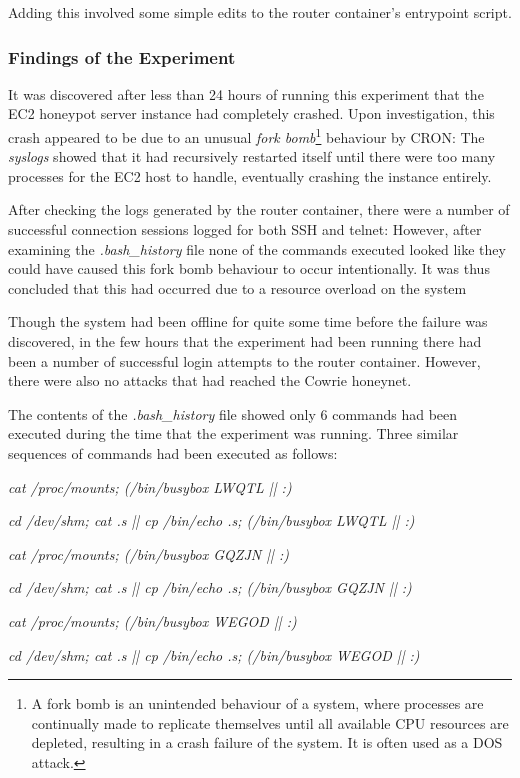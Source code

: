 Adding this involved some simple edits to the router container's entrypoint script.

\subsubsection{Findings of the Experiment}
\label{Experiment1Iteration2Results} It was discovered after less than 24 hours of running this experiment that the EC2 honeypot server instance had completely crashed. Upon investigation, this crash appeared to be due to an unusual \textit{fork bomb}\footnote{A fork bomb is an unintended behaviour of a system, where processes are continually made to replicate themselves until all available CPU resources are depleted, resulting in a crash failure of the system. It is often used as a DOS attack.} behaviour by CRON: The \textit{syslogs} showed that it had recursively restarted itself until there were too many processes for the EC2 host to handle, eventually crashing the instance entirely.

After checking the logs generated by the router container, there were a number of successful connection sessions logged for both SSH and telnet: However, after examining the \textit{.bash\_history} file none of the commands executed looked like they could have caused this fork bomb behaviour to occur intentionally. It was thus concluded that this had occurred due to a resource overload on the system

Though the system had been offline for quite some time before the failure was discovered, in the few hours that the experiment had been running there had been a number of successful login attempts to the router container. However, there were also no attacks that had reached the Cowrie honeynet. 

The contents of the \textit{.bash\_history} file showed only 6 commands had been executed during the time that the experiment was running. Three similar sequences of commands had been executed as follows:

\begin{center}
    \textit{cat /proc/mounts; (/bin/busybox LWQTL || :)}
    
    \textit{cd /dev/shm; cat .s || cp /bin/echo .s; (/bin/busybox LWQTL || :)}
    
    \textit{cat /proc/mounts; (/bin/busybox GQZJN || :)}
    
    \textit{cd /dev/shm; cat .s || cp /bin/echo .s; (/bin/busybox GQZJN || :)}
    
    \textit{cat /proc/mounts; (/bin/busybox WEGOD || :)}
    
    \textit{cd /dev/shm; cat .s || cp /bin/echo .s; (/bin/busybox WEGOD || :)}
\end{center}


